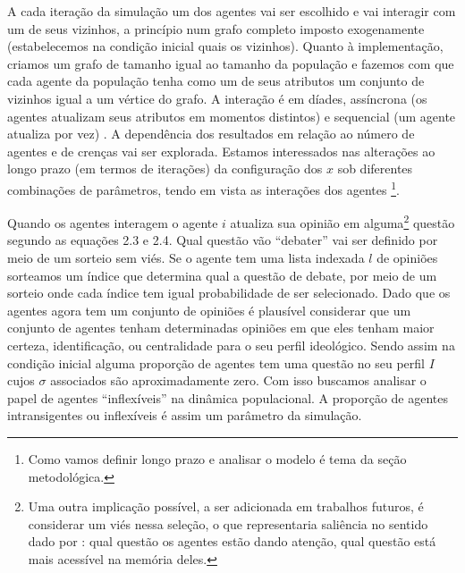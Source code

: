 A cada iteração da simulação um dos agentes vai ser escolhido e vai interagir
com um de seus vizinhos, a princípio num grafo completo imposto exogenamente
(estabelecemos na condição inicial quais os vizinhos). Quanto à implementação,
criamos um grafo de tamanho igual ao tamanho da população e fazemos com que cada
agente da população tenha como um de seus atributos um conjunto de vizinhos
igual a um vértice do grafo. A interação é em díades, assíncrona (os
agentes atualizam seus atributos em momentos distintos) e sequencial (um agente
atualiza por vez) \cite{wilensky2015introduction}. A dependência dos resultados
em relação ao número de agentes e de crenças vai ser explorada. Estamos
interessados nas alterações ao longo prazo (em termos de iterações) da
configuração dos \(x\) sob diferentes combinações de parâmetros, tendo em vista
as interações dos agentes \cite{acemoglu2011opinion} \footnote{Como vamos
  definir longo prazo e analisar o modelo é tema da seção metodológica.}.

Quando os agentes interagem o agente \(i\) atualiza sua opinião em
alguma\footnote{ Uma outra implicação possível, a ser adicionada em trabalhos
  futuros, é considerar um viés nessa seleção, o que representaria saliência no
  sentido dado por : qual questão os agentes estão
  dando atenção, qual questão está mais acessível na memória deles.} questão
segundo as equações 2.3 e 2.4. Qual questão vão ``debater'' vai ser definido por
meio de um sorteio sem viés. Se o agente tem uma lista indexada \(l\) de
opiniões sorteamos um índice que determina qual a questão de debate, por meio de
um sorteio onde cada índice tem igual probabilidade de ser selecionado. Dado que
os agentes agora tem um conjunto de opiniões é plausível considerar que um
conjunto de agentes tenham determinadas opiniões em que eles tenham maior
certeza, identificação, ou centralidade para o seu perfil ideológico. Sendo
assim na condição inicial alguma proporção de agentes tem uma questão no seu
perfil \(I\) cujos \(\sigma\) associados são aproximadamente zero. Com isso buscamos
analisar o papel de agentes ``inflexíveis'' na dinâmica populacional. A
proporção de agentes intransigentes ou inflexíveis é assim um parâmetro da
simulação.

